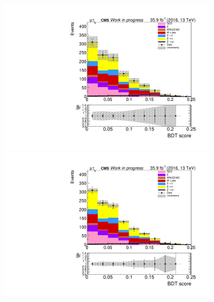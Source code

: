 \begin{figure}[htp]
	\begin{multicols}{2}
		\includegraphics[width=\linewidth]{plots/mt/MultiJet_prefit.pdf}\par 
		\includegraphics[width=\linewidth]{plots/mt/MultiJet_postfit.pdf}\par
	\end{multicols}		
\end{figure}




